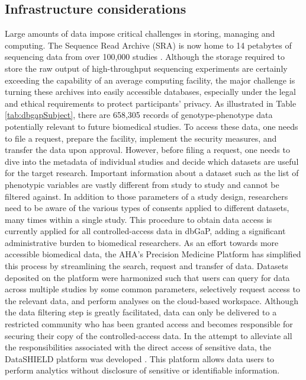 \documentclass[letter]{bioinfo}
\begin{document}
	
	\subsection*{Infrastructure considerations} 
	Large amounts of data impose critical challenges in storing, managing and computing. The Sequence Read Archive (SRA) \citep{Leinonen:2011:Sequence} is now home to 14 petabytes of sequencing data from over 100,000 studies \citep{Langmead:2018:Cloud}.
	Although the storage required to store the raw output of high-throughput sequencing experiments are certainly exceeding the capability of an average computing facility, the major challenge is turning these archives into easily accessible databases, especially under the legal and ethical requirements to protect participants' privacy.
	As illustrated in Table \ref{tab:dbgapSubject}, there are 658,305 records of genotype-phenotype data potentially relevant to future biomedical studies. To access these data, one needs to file a request, prepare the facility, implement the security measures, and transfer the data upon approval. However, before filing a request, one needs to dive into the metadata of individual studies and decide which datasets are useful for the target research. Important information about a dataset such as the list of phenotypic variables are vastly different from study to study and cannot be filtered against. In addition to those parameters of a study design, researchers need to be aware of the various types of consents applied to different datasets, many times within a single study. This procedure to obtain data access is currently applied for all controlled-access data in dbGaP, adding a significant administrative burden to biomedical researchers.
	As an effort towards more accessible biomedical data, the AHA's Precision Medicine Platform \citep{Kass-Hout:2018:American} has simplified this process by streamlining the search, request and transfer of data. Datasets deposited on the platform were harmonized such that users can query for data across multiple studies by some common parameters, selectively request access to the relevant data, and perform analyses on the cloud-based workspace.
	Although the data filtering step is greatly facilitated, data can only be delivered to a restricted community who has been granted access and becomes responsible for securing their copy of the controlled-access data. In the attempt to alleviate all the responsibilities associated with the direct access of sensitive data, the DataSHIELD platform was developed \citep{Gaye:2014:DataSHIELD, Wilson:2017:DataSHIELD}. This platform allows data users to perform analytics without disclosure of sensitive or identifiable information.
\end{document}
